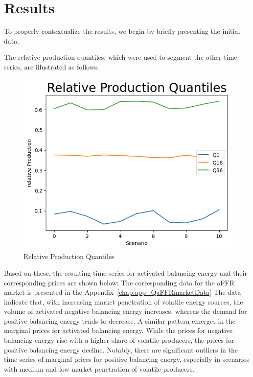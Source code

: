 \chapter{Results}

To properly contextualize the results, we begin by briefly presenting the initial data.


The relative production quantiles, which were used to segment the other time series, are illustrated as follows:

\begin{figure}[!h]
	\centering
	\includegraphics[width=0.7\linewidth]{pictures/results/relativeProduktionQuantils.png}
	\caption{Relative Production Quantiles}
	\label{fig:Relative Production Quantiles}
\end{figure}

Based on these, the resulting time series for activated balancing energy and their corresponding prices are shown below:
The corresponding data for the aFFR market is presented in the Appendix~\ref{chap:app_QaFFRmarketData}
The data indicate that, with increasing market penetration of volatile energy sources, the volume of activated negative balancing energy increases,
whereas the demand for positive balancing energy tends to decrease.
A similar pattern emerges in the marginal prices for activated balancing energy.
While the prices for negative balancing energy rise with a higher share of volatile producers,
the prices for positive balancing energy decline.
Notably, there are significant outliers in the time series of marginal prices for positive balancing energy,
especially in scenarios with medium and low market penetration of volatile producers.

